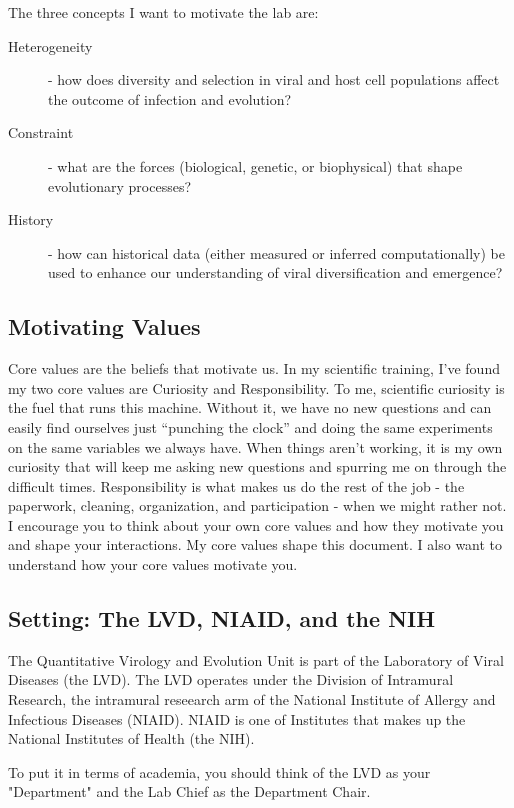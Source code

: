 \documentclass[10pt, letterpaper, twocolumn]{article} %
\begin{document}
The three concepts I want to motivate the lab are:
\begin{description}
	\item [Heterogeneity] - how does diversity and selection in viral and host cell populations affect the outcome of infection and evolution?
	\item [Constraint] - what are the forces (biological, genetic, or biophysical) that shape evolutionary processes?
	\item [History] - how can historical data (either measured or inferred computationally) be used to enhance our understanding of viral diversification and emergence?
\end{description}
\subsection{Motivating Values}
Core values are the beliefs that motivate us. In my scientific training, I’ve found my two core values are Curiosity and Responsibility. To me, scientific curiosity is the fuel that runs this machine. Without it, we have no new questions and can easily find ourselves just “punching the clock” and doing the same experiments on the same variables we always have. When things aren’t working, it is my own curiosity that will keep me asking new questions and spurring me on through the difficult times. Responsibility is what makes us do the rest of the job - the paperwork, cleaning, organization, and participation - when we might rather not. I encourage you to think about your own core values and how they motivate you and shape your interactions. My core values shape this document. I also want to understand how your core values motivate you.
\subsection{Setting: The LVD, NIAID, and the NIH}
The Quantitative Virology and Evolution Unit is part of the Laboratory of Viral Diseases (the LVD). The LVD operates under the Division of Intramural Research, the intramural reseearch arm of the National Institute of Allergy and Infectious Diseases (NIAID). NIAID is one of Institutes that makes up the National Institutes of Health (the NIH).

To put it in terms of academia, you should think of the LVD as your "Department" and the Lab Chief as the Department Chair.
\end{document}
